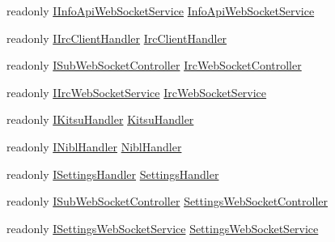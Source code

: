 \begin{DoxyCompactItemize}
\item 
readonly \mbox{\hyperlink{interface_little_weeb_library_1_1_services_1_1_i_info_api_web_socket_service}{I\+Info\+Api\+Web\+Socket\+Service}} \mbox{\hyperlink{class_little_weeb_library_1_1_start_up_af07b74fa1eae59d33216c2931d0f764a}{Info\+Api\+Web\+Socket\+Service}}
\item 
readonly \mbox{\hyperlink{interface_little_weeb_library_1_1_handlers_1_1_i_irc_client_handler}{I\+Irc\+Client\+Handler}} \mbox{\hyperlink{class_little_weeb_library_1_1_start_up_a2fc62a1c073c34ef1d402bd8f63d2934}{Irc\+Client\+Handler}}
\item 
readonly \mbox{\hyperlink{interface_little_weeb_library_1_1_controllers_1_1_i_sub_web_socket_controller}{I\+Sub\+Web\+Socket\+Controller}} \mbox{\hyperlink{class_little_weeb_library_1_1_start_up_a47d1759095fa3e41fccb1a6d6997a91c}{Irc\+Web\+Socket\+Controller}}
\item 
readonly \mbox{\hyperlink{interface_little_weeb_library_1_1_services_1_1_i_irc_web_socket_service}{I\+Irc\+Web\+Socket\+Service}} \mbox{\hyperlink{class_little_weeb_library_1_1_start_up_a5f3d87069480ab499770d8aed9b20a40}{Irc\+Web\+Socket\+Service}}
\item 
readonly \mbox{\hyperlink{interface_little_weeb_library_1_1_handlers_1_1_i_kitsu_handler}{I\+Kitsu\+Handler}} \mbox{\hyperlink{class_little_weeb_library_1_1_start_up_a5a49b71bffa630f5a24994a9c5d0482c}{Kitsu\+Handler}}
\item 
readonly \mbox{\hyperlink{interface_little_weeb_library_1_1_handlers_1_1_i_nibl_handler}{I\+Nibl\+Handler}} \mbox{\hyperlink{class_little_weeb_library_1_1_start_up_a87cc37de3a24ab2aafe37a43f133b91b}{Nibl\+Handler}}
\item 
readonly \mbox{\hyperlink{interface_little_weeb_library_1_1_handlers_1_1_i_settings_handler}{I\+Settings\+Handler}} \mbox{\hyperlink{class_little_weeb_library_1_1_start_up_a42ceac2446a2d7593923c9f1b67d9f34}{Settings\+Handler}}
\item 
readonly \mbox{\hyperlink{interface_little_weeb_library_1_1_controllers_1_1_i_sub_web_socket_controller}{I\+Sub\+Web\+Socket\+Controller}} \mbox{\hyperlink{class_little_weeb_library_1_1_start_up_a2c80109780ba0dc7597ad400327dc25f}{Settings\+Web\+Socket\+Controller}}
\item 
readonly \mbox{\hyperlink{interface_little_weeb_library_1_1_services_1_1_i_settings_web_socket_service}{I\+Settings\+Web\+Socket\+Service}} \mbox{\hyperlink{class_little_weeb_library_1_1_start_up_aa6541f1fbf659fd81e0497cb3ed11904}{Settings\+Web\+Socket\+Service}}

\end{DoxyCompactItemize}
